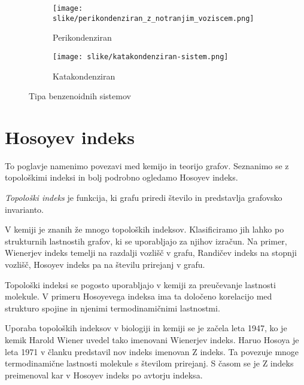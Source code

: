 \documentclass[mat1, tisk]{fmfdelo}
\begin{document}
\begin{figure}[ht!]
  \centering
  \begin{subfigure}{.5\textwidth}
    \centering
    \texttt{[image: slike/perikondenziran\_z\_notranjim\_voziscem.png]}
    \caption{Perikondenziran}
    \label{fig:sub1}
  \end{subfigure}%
  \begin{subfigure}{.5\textwidth}
    \centering
    \texttt{[image: slike/katakondenziran-sistem.png]}
    \caption{Katakondenziran}
    \label{fig:sub2}
  \end{subfigure}
  \caption{Tipa benzenoidnih sistemov}
  \label{fig:peri-kata}
\end{figure}









\section{Hosoyev indeks}

To poglavje namenimo povezavi med kemijo in teorijo grafov. 
Seznanimo se z topološkimi indeksi in bolj podrobno ogledamo 
Hosoyev indeks.

\begin{definicija}
    \emph{Topološki indeks} je funkcija, ki grafu priredi število in
    predstavlja grafovsko invarianto.
\end{definicija}

V kemiji je znanih že mnogo topoloških indeksov.
Klasificiramo jih lahko po strukturnih lastnostih grafov, 
ki se uporabljajo za njihov izračun.
Na primer, Wienerjev indeks temelji na razdalji vozlišč v grafu, 
Randičev indeks na stopnji vozlišč,
Hosoyev indeks pa na številu prirejanj v grafu.

Topološki indeksi se pogosto uporabljajo v kemiji
za preučevanje lastnosti molekule. 
V primeru Hosoyevega indeksa ima ta določeno
korelacijo med strukturo spojine in njenimi 
termodinamičnimi lastnostmi.

Uporaba topoloških indeksov v biologiji in kemiji 
se je začela leta 1947, ko je kemik Harold Wiener
uvedel tako imenovani Wienerjev indeks. 
Haruo Hosoya je leta 1971 v članku \cite{HOSOYA}
predstavil nov indeks imenovan Z indeks.
Ta povezuje mnoge termodinamične lastnosti molekule
s številom prirejanj.
S časom se je 
Z indeks preimenoval
kar v  Hosoyev indeks po avtorju indeksa.
   
\end{document}
